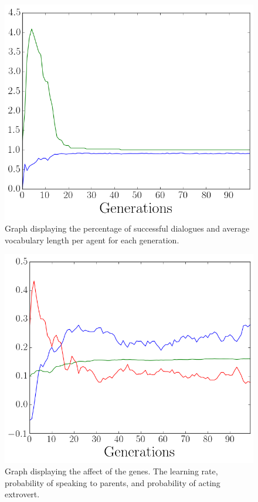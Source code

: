 \begin{figure}[htbp]
    \centering
    \includegraphics[scale=0.5]{fig/Results/Exp2/Vocabulary1}
    \caption{Graph displaying the percentage of successful dialogues and average vocabulary length per agent for each generation.}
    \label{fig:Vocabulary2}
\end{figure}
\begin{figure}[htbp]
    \centering
    \includegraphics[scale=0.5]{fig/Results/Exp2/Genes1}
    \caption{Graph displaying the affect of the genes. The learning rate, probability of speaking to parents, and probability of acting extrovert.}
    \label{fig:Genes2}
\end{figure}

